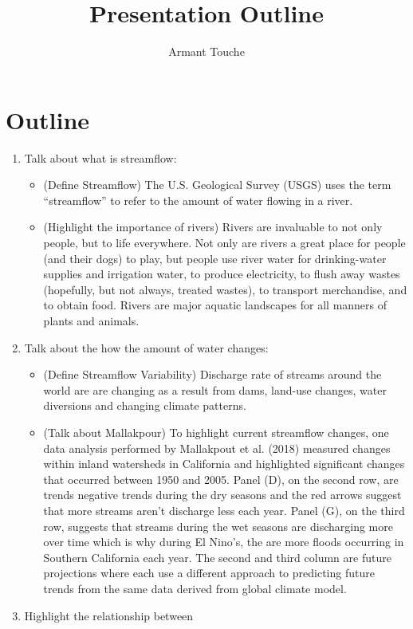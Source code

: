 \documentclass{article}
\begin{document}
\title{\vspace{-2cm}Presentation Outline}
\author{Armant Touche}
\maketitle

\section{Outline}

\begin{enumerate}
    
    \item Talk about what is streamflow:

    \begin{itemize}

        \item (Define Streamflow) The U.S. Geological Survey (USGS) uses the term “streamflow” to refer to the amount of water flowing in a river.
        \item (Highlight the importance of rivers) Rivers are invaluable to not only people, but to life everywhere. Not only are rivers a great place for people (and their dogs) to play, but people use river water for drinking-water supplies and irrigation water, to produce electricity, to flush away wastes (hopefully, but not always, treated wastes), to transport merchandise, and to obtain food. Rivers are major aquatic landscapes for all manners of plants and animals. 

    \end{itemize}

    \item Talk about the how the amount of water changes:

    \begin{itemize}

    \item (Define Streamflow Variability) Discharge rate of streams around the world are are changing as a result from dams, land-use changes, water diversions and changing climate patterns.

    \item (Talk about Mallakpour) To highlight current streamflow changes, one data analysis performed by Mallakpout et al. (2018) measured changes within inland watersheds in California and highlighted significant changes that occurred between 1950 and 2005. Panel (D), on the second row, are trends negative trends during the dry seasons and the red arrows suggest that more streams aren't discharge less each year. Panel (G), on the third row, suggests that streams during the wet seasons are discharging more over time which is why during El Nino's, the are more floods occurring in Southern California each year. The second and third column are future projections where each use a different approach to predicting future trends from the same data derived from global climate model. 

    \end{itemize}

    \item Highlight the relationship between 

\end{enumerate}
\end{document}
